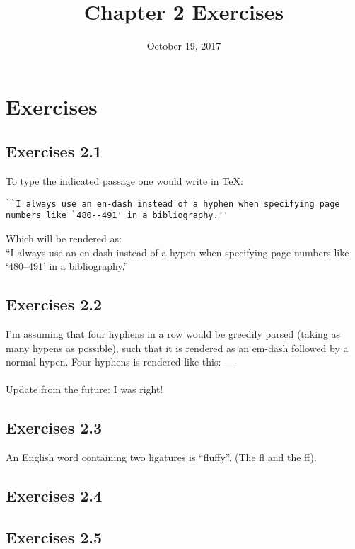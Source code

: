 \documentclass{article}
\title {Chapter 2 Exercises}
\date {October 19, 2017}
\begin{document}
\maketitle
{}

\section*{Exercises}
\subsection*{Exercises 2.1}
To type the indicated passage one would write in \TeX :
\begin{lstlisting}[breaklines]
``I always use an en-dash instead of a hyphen when specifying page numbers like `480--491' in a bibliography.''
\end{lstlisting} 
Which will be rendered as: \\
``I always use an en-dash instead of a hypen when specifying page numbers like `480--491' in a bibliography.'' 

\subsection*{Exercises 2.2}
I'm assuming that four hyphens in a row would be greedily parsed (taking as many hypens as possible), such that it is rendered as an em-dash followed by a normal hypen. Four hyphens is rendered like this: ---- \\ \\
Update from the future: I was right!

\subsection*{Exercises 2.3}
An English word containing two ligatures is ``fluffy''. (The fl and the ff).

\subsection*{Exercises 2.4}
\subsection*{Exercises 2.5}
\end{document}

